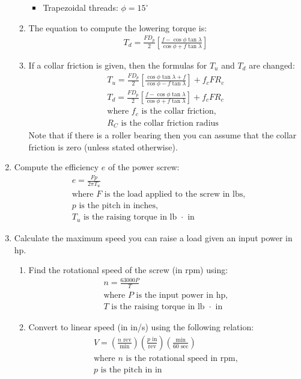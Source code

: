 \documentclass[11pt, fleqn]{article}
\begin{document}
\begin{enumerate}
\begin{enumerate}
\begin{itemize}
            \item Trapezoidal threads: $\phi = 15^{\circ}$
        \end{itemize}
        \item The equation to compute the lowering torque is:
        \begin{align*}
            T_d = \frac{FD_p}{2}\left[\frac{f-\cos{\phi}\tan{\lambda}}{\cos{\phi}+f\tan{\lambda}} \right]
        \end{align*}
        \item If a collar friction is given, then the formulas for $T_u$ and $T_d$ are changed:
        \begin{align*}
         T_u = \frac{FD_p}{2}\left[\frac{\cos{\phi}\tan{\lambda} + f}{\cos{\phi}-f\tan{\lambda}} \right] + f_c F R_c\\
            T_d = \frac{FD_p}{2}\left[\frac{f-\cos{\phi}\tan{\lambda}}{\cos{\phi}+f\tan{\lambda}} \right] + f_c F R_c\\
            \text{where $f_c$ is the collar friction,}\\
            \text{$R_C$ is the collar friction radius}
        \end{align*}
        Note that if there is a roller bearing then you can assume that the collar friction is zero (unless stated otherwise).
    \end{enumerate}
    \item Compute the efficiency $e$ of the power screw:
    \begin{align*}
        e=\frac{Fp}{2\pi T_u}\\
        \text{where $F$ is the load applied to the screw in lbs,}\\
        \text{$p$ is the pitch in inches,}\\
        \text{$T_u$ is the raising torque in lb $\cdot$ in}
    \end{align*}
    \item Calculate the maximum speed you can raise a load given an input power in hp.
    \begin{enumerate}
        \item Find the rotational speed of the screw (in rpm) using:
        \begin{align*}
            n=\frac{63000P}{T}\\
            \text{where $P$ is the input power in hp,}\\
            \text{$T$ is the raising torque in lb $\cdot$ in}
        \end{align*}
        \item Convert to linear speed (in in/s) using the following relation:
        \begin{align*}
            V = \left(\frac{n\text{ rev}}{\text{min}}\right)\left(\frac{p\text{ in}}{\text{rev}}\right)\left(\frac{\text{min}}{60\text{ sec}}\right)\\
            \text{where $n$ is the rotational speed in rpm,}\\
            \text{$p$ is the pitch in in}
        \end{align*}
    \end{enumerate}
\end{enumerate}
\end{document}
